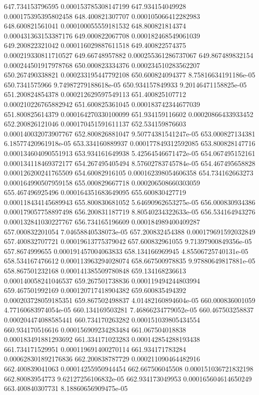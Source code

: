 {647.734153796595 0.000153785308147199
647.934154049928 0.000175395395802458
648.400821307707 0.000105066412282983
648.600821561041 0.000100055559181532
648.800821814374 0.000431363153387176
649.000822067708 0.000182468549061039
649.200822321042 0.000116029887611518
649.400822574375 0.000219330811710527
649.66748957882 0.000255361286737067
649.867489832154 0.000244501917978768
650.000823334376 0.000234510283562207
650.267490338821 0.000233195447792108
650.600824094377 8.75816634191186e-05
650.7341575966 9.74987279188618e-05
650.934157849933 9.20146471158825e-05
651.200824854378 0.000212629597549113
651.400825107712 0.000210226765882942
651.600825361045 0.000183742344677039
651.800825614379 0.000164270330100099
651.934159116602 0.00020866433933452
652.200826121046 0.000170451591611137
652.534159876603 0.000140032073907767
652.800826881047 9.50774381541247e-05
653.000827134381 6.18577420961918e-05
653.334160889937 0.000177849312592085
653.800828147716 0.000134604090551913
653.934161649938 5.42564546671472e-05
654.067495152161 0.000134118469372177
654.267495405494 8.57602783745784e-05
654.467495658828 0.000126200241765509
654.60082916105 0.000162398054606358
654.734162663273 0.000164990507959158
655.000829667718 0.000206508660303059
655.467496925496 0.000164351683649095
655.600830427719 0.000118434145689943
655.800830681052 5.64690962653275e-05
656.000830934386 0.000179057758897498
656.200831187719 8.80540234322633e-05
656.534164943276 0.000132841030227767
656.734165196609 0.000184989400409287
657.000832201054 7.04658840538073e-05
657.200832454388 0.000179691592032849
657.400832707721 0.00019613775379042
657.600832961055 9.71397900849356e-05
657.8674999655 0.000191457004063833
658.134166969945 4.85506725740131e-05
658.534167476612 0.000113963294028074
658.667500978835 9.97880649817881e-05
658.867501232168 0.000141385509780848
659.134168236613 0.000140058241046537
659.267501738836 0.000119494244803994
659.467501992169 0.000120717418904382
659.600835494392 0.000203728059185351
659.867502498837 4.01482160894604e-05
660.000836001059 4.77160683974054e-05
660.134169503281 7.46866234779052e-05
660.467503258837 0.000204474088585441
660.734170263282 0.000151039805434554
660.934170516616 0.000156909234283484
661.067504018838 0.000183491881293692
661.334171023283 0.000142854288193438
661.734171529951 0.000119691400270114
661.934171783284 0.000628301892176836
662.200838787729 0.000211090464482916
662.400839041063 0.00014255950944454
662.667506045508 0.000151036721832198
662.80083954773 9.62127256106832e-05
662.934173049953 0.000165604614650249
663.400840307731 8.18860656909475e-05
}
